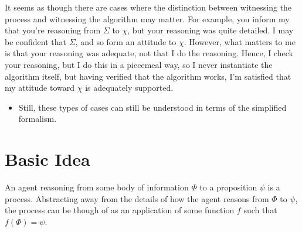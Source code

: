 \documentclass[10pt]{article}
\newcommand{\futin}{\ensuremath{\Sigma}}
\newcommand{\futout}{\ensuremath{\chi}}
\begin{document}
\begin{note}
  It seems as though there are cases where the distinction between witnessing the process and witnessing the algorithm may matter.
  For example, you inform my that you're reasoning from \(\futin\) to \(\futout\), but your reasoning was quite detailed.
  I may be confident that \(\futin\), and so form an attitude to \(\futout\).
  However, what matters to me is that your reasoning was adequate, not that I do the reasoning.
  Hence, I check your reasoning, but I do this in a piecemeal way, so I never instantiate the algorithm itself, but having verified that the algorithm works, I'm satisfied that my attitude toward \(\futout\) is adequately supported.
  \begin{itemize}
  \item Still, these types of cases can still be understood in terms of the simplified formalism.
  \end{itemize}
\end{note}








\newpage


\section{Basic Idea}
\label{sec:basic-idea}

An agent reasoning from some body of information \(\Phi\) to a proposition \(\psi\) is a process.
Abstracting away from the details of how the agent reasons from \(\Phi\) to \(\psi\), the process can be though of as an application of some function \(f\) such that \(f(\Phi) = \psi\).

\end{document}
